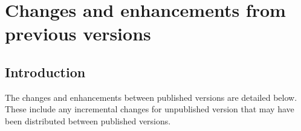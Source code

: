 \section{Changes and enhancements from previous versions}


\subsection{Introduction}

The changes and enhancements between published versions \SPM are detailed below. These include any incremental changes for unpublished version that may have been distributed between published versions. 
